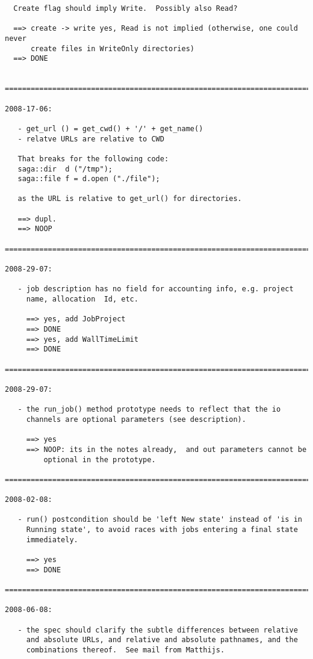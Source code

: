 \documentclass{article}
\begin{document}
\begin{verbatim}
  Create flag should imply Write.  Possibly also Read?

  ==> create -> write yes, Read is not implied (otherwise, one could never 
      create files in WriteOnly directories)
  ==> DONE


=========================================================================

2008-17-06:

   - get_url () = get_cwd() + '/' + get_name()
   - relatve URLs are relative to CWD

   That breaks for the following code:
   saga::dir  d ("/tmp");
   saga::file f = d.open ("./file");

   as the URL is relative to get_url() for directories.

   ==> dupl.
   ==> NOOP

=========================================================================

2008-29-07:

   - job description has no field for accounting info, e.g. project
     name, allocation  Id, etc.

     ==> yes, add JobProject
     ==> DONE
     ==> yes, add WallTimeLimit
     ==> DONE

=========================================================================

2008-29-07:

   - the run_job() method prototype needs to reflect that the io
     channels are optional parameters (see description).

     ==> yes
     ==> NOOP: its in the notes already,  and out parameters cannot be
         optional in the prototype.

=========================================================================

2008-02-08:

   - run() postcondition should be 'left New state' instead of 'is in
     Running state', to avoid races with jobs entering a final state
     immediately.

     ==> yes
     ==> DONE

=========================================================================

2008-06-08:

   - the spec should clarify the subtle differences between relative
     and absolute URLs, and relative and absolute pathnames, and the
     combinations thereof.  See mail from Matthijs.


\end{verbatim}
\end{document}
